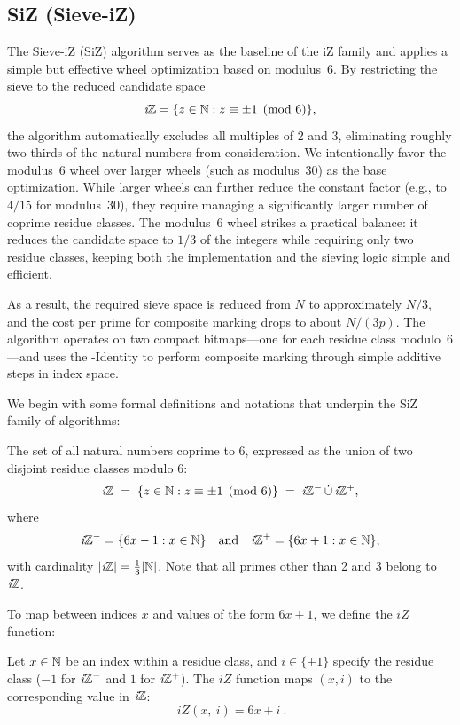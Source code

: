 \documentclass{article}
\begin{document}

\subsection{SiZ (Sieve-iZ)} \label{alg:siz}

The Sieve-iZ (SiZ) algorithm serves as the baseline of the iZ family and applies a simple but effective wheel optimization based on modulus~6. By restricting the sieve to the reduced candidate space
\[
\textit{i}\mathbb{Z} = \{z \in \mathbb{N} : z \equiv \pm 1 \pmod{6}\},
\]
the algorithm automatically excludes all multiples of 2 and 3, eliminating roughly two-thirds of the natural numbers from consideration. 
We intentionally favor the modulus~6 wheel over larger wheels (such as modulus~30) as the base optimization. While larger wheels can further reduce the constant factor (e.g., to $4/15$ for modulus~30), they require managing a significantly larger number of coprime residue classes. The modulus~6 wheel strikes a practical balance: it reduces the candidate space to $1/3$ of the integers while requiring only two residue classes, keeping both the implementation and the sieving logic simple and efficient.

As a result, the required sieve space is reduced from $N$ to approximately $N/3$, and the cost per prime for composite marking drops to about $N/(3p)$. The algorithm operates on two compact bitmaps—one for each residue class modulo~6—and uses the \Xp-Identity to perform composite marking through simple additive steps in index space.

We begin with some formal definitions and notations that underpin the SiZ family of algorithms:
\begin{definition}    
    The set of all natural numbers coprime to 6, expressed as the union of two disjoint residue classes modulo 6:
    \[
    \textit{i}\mathbb{Z} \;=\; \{ z\in\mathbb{N} : z\equiv \pm 1 \pmod{6} \} \;=\; \textit{i}\mathbb{Z}^-\,\dot\cup\,\textit{i}\mathbb{Z}^+,
    \]
    where
    \[
    \textit{i}\mathbb{Z}^- = \{6x-1:x\in\mathbb{N}\} \quad\text{and}\quad \textit{i}\mathbb{Z}^+ = \{6x+1:x\in\mathbb{N}\},
    \]
    with cardinality $|\textit{i}\mathbb{Z}| = \tfrac{1}{3} |\mathbb{N}|$. Note that all primes other than 2 and 3 belong to $\textit{i}\mathbb{Z}$.
\end{definition}

\noindent
To map between indices $x$ and values of the form $6x\pm1$, we define the $iZ$ function:

\begin{definition}
    Let $x \in \mathbb{N}$ be an index within a residue class, and $i \in \{\pm 1\}$ specify the residue class ($-1$ for $\textit{i}\mathbb{Z}^-$ and $1$ for $\textit{i}\mathbb{Z}^+$). The $iZ$ function maps $(x, i)$ to the corresponding value in $\textit{i}\mathbb{Z}$:
    \[
    \boxed{\ iZ(x,\ i) = 6x+i\ }.
    \]
\end{definition}
\end{document}
